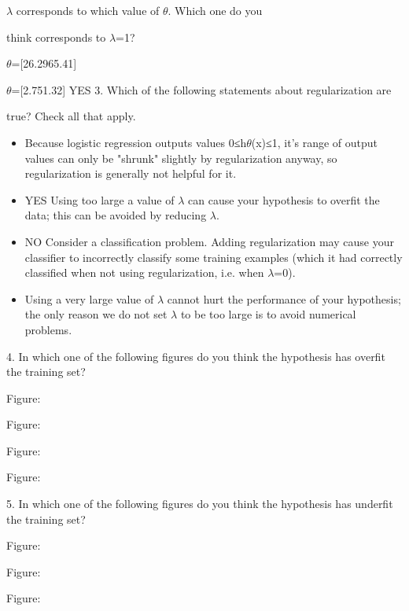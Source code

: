 $\lambda$ corresponds to which value of $\theta$. Which one do you

think corresponds to $\lambda$=1?

$\theta$=[26.2965.41]

$\theta$=[2.751.32]  YES
3. 
Which of the following statements about regularization are

true? Check all that apply.


\begin{itemize}
\item Because logistic regression outputs values 0≤h$\theta$(x)≤1, it's range of output values can only be "shrunk" slightly by regularization anyway, so regularization is generally not helpful for it.

\item YES Using too large a value of $\lambda$ can cause your hypothesis to overfit the data; this can be avoided by reducing $\lambda$.
\item 
NO Consider a classification problem. Adding regularization may cause your classifier to incorrectly classify some training examples (which it had correctly classified when not using regularization, i.e. when $\lambda$=0).
\item 
Using a very large value of $\lambda$ cannot hurt the performance of your hypothesis; the only reason we do not set $\lambda$ to be too large is to avoid numerical problems.
\end{itemize}
4. 
In which one of the following figures do you think the hypothesis has overfit the training set?

Figure:



Figure:



Figure:



Figure:


5. 
In which one of the following figures do you think the hypothesis has underfit the training set?

Figure:



Figure:



Figure:



